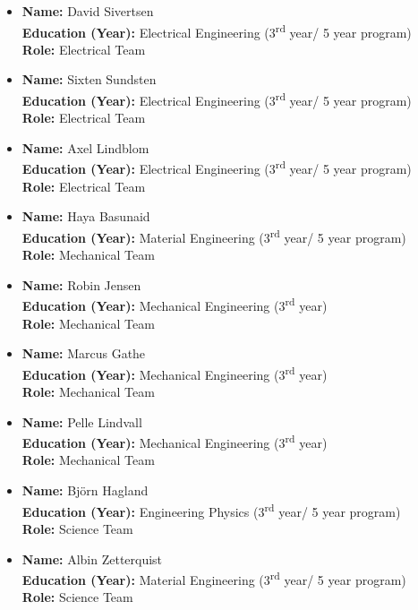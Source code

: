 \begin{itemize}
    \item \textbf{Name:} David Sivertsen \\
    \textbf{Education (Year):} Electrical Engineering (3\textsuperscript{rd} year/ 5 year program) \\
    \textbf{Role:} Electrical Team

    \item \textbf{Name:} Sixten Sundsten \\
    \textbf{Education (Year):} Electrical Engineering (3\textsuperscript{rd} year/ 5 year program) \\
    \textbf{Role:} Electrical Team

    \item \textbf{Name:} Axel Lindblom \\
    \textbf{Education (Year):} Electrical Engineering (3\textsuperscript{rd} year/ 5 year program) \\
    \textbf{Role:} Electrical Team

    \item \textbf{Name:} Haya Basunaid \\
    \textbf{Education (Year):} Material Engineering (3\textsuperscript{rd} year/ 5 year program) \\
    \textbf{Role:} Mechanical Team

    \item \textbf{Name:} Robin Jensen \\
    \textbf{Education (Year):} Mechanical Engineering (3\textsuperscript{rd} year) \\
    \textbf{Role:} Mechanical Team

    \item \textbf{Name:} Marcus Gathe \\
    \textbf{Education (Year):} Mechanical Engineering (3\textsuperscript{rd} year) \\
    \textbf{Role:} Mechanical Team

    \item \textbf{Name:} Pelle Lindvall \\
    \textbf{Education (Year):} Mechanical Engineering (3\textsuperscript{rd} year) \\
    \textbf{Role:} Mechanical Team

    \item \textbf{Name:} Björn Hagland \\
    \textbf{Education (Year):} Engineering Physics (3\textsuperscript{rd} year/ 5 year program) \\
    \textbf{Role:} Science Team
    
    \item \textbf{Name:} Albin Zetterquist \\
    \textbf{Education (Year):} Material Engineering (3\textsuperscript{rd} year/ 5 year program) \\
    \textbf{Role:} Science Team
\end{itemize}

\clearpage
